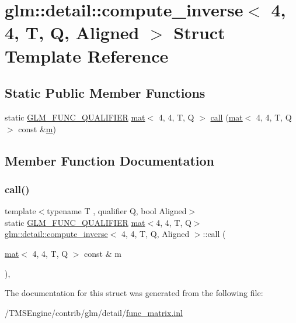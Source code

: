 \hypertarget{structglm_1_1detail_1_1compute__inverse_3_014_00_014_00_01_t_00_01_q_00_01_aligned_01_4}{}\section{glm\+:\+:detail\+:\+:compute\+\_\+inverse$<$ 4, 4, T, Q, Aligned $>$ Struct Template Reference}
\label{structglm_1_1detail_1_1compute__inverse_3_014_00_014_00_01_t_00_01_q_00_01_aligned_01_4}
\subsection*{Static Public Member Functions}
\begin{DoxyCompactItemize}
\item 
static \hyperlink{setup_8hpp_a33fdea6f91c5f834105f7415e2a64407}{G\+L\+M\+\_\+\+F\+U\+N\+C\+\_\+\+Q\+U\+A\+L\+I\+F\+I\+ER} \hyperlink{structglm_1_1mat}{mat}$<$ 4, 4, T, Q $>$ \hyperlink{structglm_1_1detail_1_1compute__inverse_3_014_00_014_00_01_t_00_01_q_00_01_aligned_01_4_a113ff9d7721d4a608e8d54fdf4e02fc6}{call} (\hyperlink{structglm_1_1mat}{mat}$<$ 4, 4, T, Q $>$ const \&\hyperlink{_s_d_l__opengl__glext_8h_af593500c283bf1a787a6f947f503a5c2}{m})
\end{DoxyCompactItemize}


\subsection{Member Function Documentation}
\mbox{\label{structglm_1_1detail_1_1compute__inverse_3_014_00_014_00_01_t_00_01_q_00_01_aligned_01_4_a113ff9d7721d4a608e8d54fdf4e02fc6}} 
\subsubsection{\texorpdfstring{call()}{call()}}
{\footnotesize\ttfamily template$<$typename T , qualifier Q, bool Aligned$>$ \\
static \hyperlink{setup_8hpp_a33fdea6f91c5f834105f7415e2a64407}{G\+L\+M\+\_\+\+F\+U\+N\+C\+\_\+\+Q\+U\+A\+L\+I\+F\+I\+ER} \hyperlink{structglm_1_1mat}{mat}$<$4, 4, T, Q$>$ \hyperlink{structglm_1_1detail_1_1compute__inverse}{glm\+::detail\+::compute\+\_\+inverse}$<$ 4, 4, T, Q, Aligned $>$\+::call (\begin{DoxyParamCaption}\item[{\hyperlink{structglm_1_1mat}{mat}$<$ 4, 4, T, Q $>$ const \&}]{m }\end{DoxyParamCaption})\hspace{0.3cm}{\ttfamily [inline]}, {\ttfamily [static]}}



The documentation for this struct was generated from the following file\+:\begin{DoxyCompactItemize}
\item 
/\+T\+M\+S\+Engine/contrib/glm/detail/\hyperlink{func__matrix_8inl}{func\+\_\+matrix.\+inl}\end{DoxyCompactItemize}
